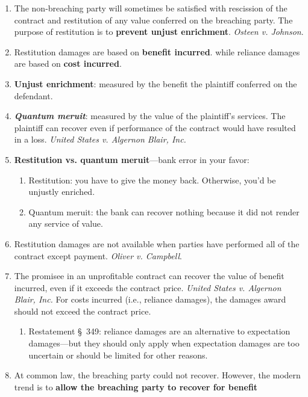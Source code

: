 \begin{enumerate}
    \item The non-breaching party will sometimes be satisfied with rescission 
    of the contract and restitution of any value conferred on the breaching 
    party. The purpose of restitution is to \textbf{prevent unjust 
    enrichment}. \emph{Osteen v. Johnson}.
    \item Restitution damages are based on \textbf{benefit incurred}. while 
    reliance damages are based on \textbf{cost incurred}.
    \item \textbf{Unjust enrichment}: measured by the benefit the plaintiff 
    conferred on the defendant.
    \item \textbf{\emph{Quantum meruit}}: measured by the value of the 
    plaintiff's services. The plaintiff can recover even if performance of the 
    contract would have resulted in a loss. \emph{United States v. Algernon 
    Blair, Inc.}
    \item \textbf{Restitution vs. quantum meruit}---bank error in your favor:
    \begin{enumerate}
        \item Restitution: you have to give the money back. Otherwise, you'd 
        be unjustly enriched.
        \item Quantum meruit: the bank can recover nothing because it did not 
        render any service of value.
    \end{enumerate}
    \item Restitution damages are not available when parties have performed 
    all of the contract except payment. \emph{Oliver v. Campbell}.
    \item The promisee in an unprofitable contract can recover the value of 
    benefit incurred, even if it exceeds the contract price. \emph{United 
    States v. Algernon Blair, Inc.} For costs incurred (i.e., reliance 
    damages), the damages award should not exceed the contract price.
    \begin{enumerate}
        \item Restatement \S\ 349: reliance damages are an alternative 
        to expectation damages---but they should only apply when expectation 
        damages are too uncertain or should be limited for other reasons.
    \end{enumerate}
    \item At common law, the breaching party could not recover. However, the 
    modern trend is to \textbf{allow the breaching party to recover for benefit 
}
\end{enumerate}
